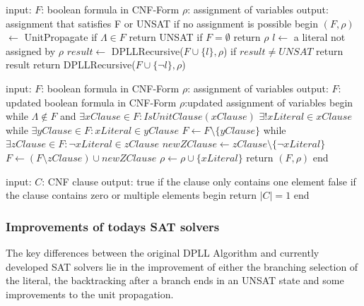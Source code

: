 \begin{algorithm}[caption={DPLLRecursive}, label={algDPLLRecursive}]
 input: $F$: boolean formula in CNF-Form
	$\rho$: assignment of variables
 output: assignment that satisfies F or 
	UNSAT if no assignment is possible
 begin
   $(F, \rho)$  $\gets$ UnitPropagate
   if $\Lambda \in F$
	return UNSAT
   if $F = \emptyset$
	return $\rho$
   $l \gets$ a literal not assigned by $\rho$
   $result \gets$ DPLLRecursive($F \cup \{l\}, \rho$)
   if $result \neq UNSAT$
	return result
   return DPLLRecursive($F \cup \{\lnot l\}, \rho$)
\end{algorithm}

\begin{algorithm}[caption={UnitPropagate}, label={algUnitProgagate}]
 input: $F$: boolean formula in CNF-Form
	$\rho$: assignment of variables
 output: $F$: updated boolean formula in CNF-Form
	$\rho$:updated assignment of variables
 begin
   while $\Lambda \notin F$ and $\exists xClause \in F: IsUnitClause(xClause)$
	$\exists! xLiteral \in xClause$
	while $\exists yClause \in F: xLiteral \in yClause$
		$F \gets F \setminus \{yClause\}$     
	while $\exists zClause \in F: \lnot xLiteral \in zClause$
		$newZClause \gets zClause \setminus \{\lnot xLiteral\}$
		$F \gets (F \setminus zClause) \cup newZClause$
	$\rho \gets \rho \cup \{xLiteral\}$
   return $(F, \rho)$
 end
\end{algorithm}
\begin{algorithm}[caption={IsUnitClause}, label={algIsUnitClause}]
 input: $C$: CNF clause
 output: true if the clause only contains one element
	false if the clause contains zero 
		or multiple elements
 begin
   return $|C| = 1$
 end
\end{algorithm}

\subsubsection{Improvements of todays SAT solvers}
The key differences between the original DPLL Algorithm and currently developed SAT solvers lie in the improvement of either the branching selection of the literal, the backtracking after a branch ends in an UNSAT state and some improvements to the unit propagation.
